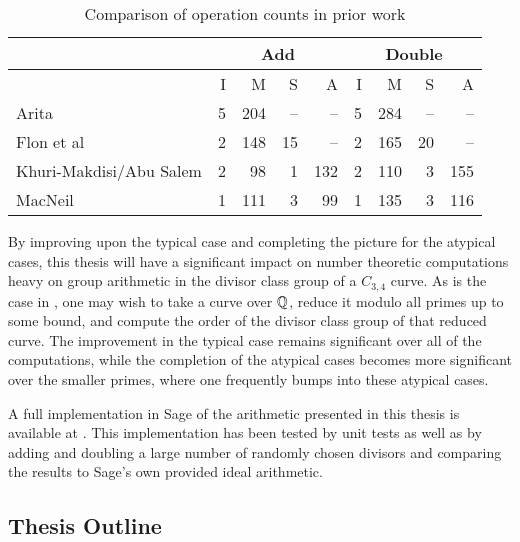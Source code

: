 \begin{table}[h]
  \caption{Comparison of operation counts in prior work}
  \label{tab_op_count_intro}
  \begin{center}
    \begin{tabular}{l|rrrr|rrrr}
      & \multicolumn{4}{|c}{Add} & \multicolumn{4}{|c}{Double} \\
      \hline
      & I & M & S & A & I & M & S & A \\
      \hline
      Arita                   & 5 & 204 & -- &  -- & 5 & 284 & -- &  -- \\
      Flon et al              & 2 & 148 & 15 &  -- & 2 & 165 & 20 &  -- \\
      Khuri-Makdisi/Abu Salem & 2 &  98 &  1 & 132 & 2 & 110 &  3 & 155 \\
      MacNeil                 & 1 & 111 &  3 &  99 & 1 & 135 &  3 & 116 
    \end{tabular}
  \end{center}
\end{table}

By improving upon the typical case and completing the picture for the atypical cases,
this thesis will have a significant impact on number theoretic computations
heavy on group arithmetic in the divisor class group of a $C_{3,4}$ curve.
As is the case in \cite{sutherland16}, 
one may wish to take a curve over $\mathbb{Q}$, reduce it modulo all primes up to some bound,
and compute the order of the divisor class group of that reduced curve.
The improvement in the typical case remains significant over all of the computations,
while the completion of the atypical cases becomes more significant over the smaller primes,
where one frequently bumps into these atypical cases.

A full implementation in Sage of the arithmetic presented in this thesis is available at \cite{github}.
This implementation has been tested by unit tests as well as by adding and doubling a large number of randomly chosen divisors
and comparing the results to Sage's own provided ideal arithmetic.




\subsection{Thesis Outline}

